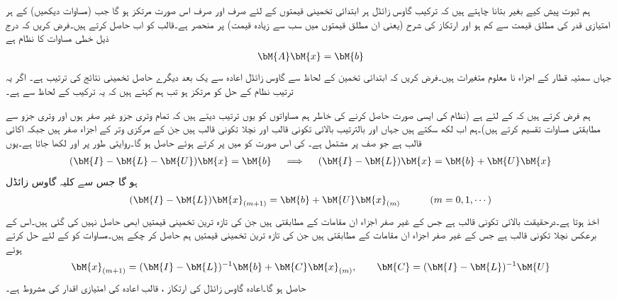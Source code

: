 ہم ثبوت پیش کیے بغیر بتانا چاہتے ہیں کہ ترکیب گاوس زائڈل  ہر ابتدائی تخمینی قیمتوں کے لئے صرف اور صرف اس صورت مرتکز ہو گا جب    (مساوات  دیکھیں) کے ہر امتیازی قدر کی  مطلق قیمت  سے کم ہو اور ارتکاز کی شرح   (یعنی ان مطلق قیمتوں میں سب سے زیادہ قیمت) پر منحصر ہے۔قالب  کو اب حاصل کرتے ہیں۔فرض کریں کہ درج ذیل  خطی مساوات کا نظام ہے
\begin{align*}
\bM{A}\bM{x}=\bM{b}
\end{align*}
جہاں سمتیہ قطار    کے اجزاء نا معلوم متغیرات  ہیں۔فرض کریں کہ ابتدائی تخمین  کے لحاظ سے
  گاوس زائڈل اعادہ سے یک بعد دیگرے حاصل تخمینی نتائج کی ترتیب ہے۔ اگر یہ ترتیب نظام کے حل کو مرتکز ہو تب ہم کہتے ہیں کہ یہ ترکیب    کے لحاظ سے  ہے۔

ہم فرض کرتے ہیں کہ  کے لئے  ہے (نظام کی ایسی صورت حاصل کرنے کی خاطر ہم مساواتوں کو یوں ترتیب دیتے ہیں کہ تمام وتری جزو غیر صفر ہوں اور وتری جزو سے مطابقتی مساوات  تقسیم کرتے ہیں)۔ہم اب  لکھ سکتے ہیں جہاں  اور  بالترتیب بالائی تکونی قالب اور نچلا تکونی قالب ہیں جن کے مرکزی وتر کے اجزاء صفر ہیں جبکہ   اکائی قالب ہے جو  صف پر مشتمل ہے۔ کی اس صورت کو  میں پر کرتے ہوئے  حاصل ہو گا۔روایتی طور پر  اور  لکھا جاتا ہے۔یوں
\begin{align*}
(\bM{I}-\bM{L}-\bM{U})\bM{x}=\bM{b}\quad \implies \quad (\bM{I}-\bM{L})\bM{x}=\bM{b}+\bM{U}\bM{x}
\end{align*}
ہو گا جس سے کلیہ گاوس زائڈل
\begin{align}\label{مساوات_خطی_اعدادی_مثال_ت}
(\bM{I}-\bM{L})\bM{x}_{(m+1)}=\bM{b}+\bM{U}\bM{x}_{(m)}\quad \quad \quad (m=0,1,\cdots)
\end{align}
اخذ ہوتا ہے۔درحقیقت  بالائی تکونی قالب ہے جس کے غیر صفر اجزاء ان مقامات کے مطابقتی ہیں جن کی تازہ ترین تخمینی قیمتیں ابھی حاصل نہیں کی گئی ہیں۔اس کے برعکس  نچلا تکونی قالب ہے جس کے غیر صفر اجزاء ان مقامات کے مطابقتی ہیں جن کی تازہ ترین تخمینی قیمتیں  ہم حاصل کر چکے ہیں۔مساوات  کو  کے لئے حل کرتے ہوئے
\begin{align}\label{مساوات_خطی_اعدادی_مثال_ٹ}
\bM{x}_{(m+1)}=(\bM{I}-\bM{L})^{-1}\bM{b}+\bM{C}\bM{x}_{(m)},\quad \quad \bM{C}=(\bM{I}-\bM{L})^{-1}\bM{U}
\end{align}
حاصل ہو گا۔اعادہ گاوس زائڈل  کی ارتکاز ، قالب اعادہ  کی امتیازی اقدار کی مشروط ہے۔

